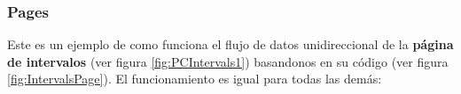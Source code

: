 \documentclass[12pt,twoside,titlepage]{report}
\begin{document}

\subsubsection{Pages}




Este es un ejemplo de como funciona el flujo de datos unidireccional de la \textbf{página de intervalos} (ver figura \ref{fig:PCIntervals1}) basandonos en su código (ver figura \ref{fig:IntervalsPage}). El funcionamiento es igual para todas las demás: 
\end{document}
